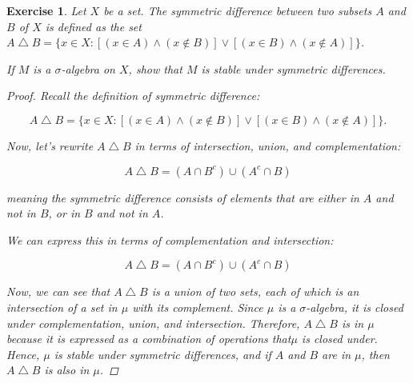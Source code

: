 \documentclass{article}
\newtheorem{exercise}{Exercise}
\begin{document}
    \begin{exercise}
        Let $X$ be a set. The symmetric difference between two subsets $A$ and $B$ of $X$ is defined as the set\\
$A \bigtriangleup B = \{x \in X : [(x \in A) \land (x \notin B)] \lor [(x \in B) \land (x \notin A)]\}$.

If $M$ is a $\sigma$-algebra on $X$, show that $M$ is stable under symmetric differences.

    \begin{proof}
        Recall the definition of symmetric difference:

\[
A \bigtriangleup B = \{x \in X : [(x \in A) \land (x \notin B)] \lor [(x \in B) \land (x \notin A)]\}.
\]

Now, let's rewrite $A \bigtriangleup B$ in terms of intersection, union, and complementation:

\[
A \bigtriangleup B = (A \cap B^c) \cup (A^c \cap B)
\]

meaning the symmetric difference consists of elements that are either in $A$ and not in $B$, or in $B$ and not in $A$.

We can express this in terms of complementation and intersection:

\[
A \bigtriangleup B = (A \cap B^c) \cup (A^c \cap B)
\]

Now, we can see that $A \bigtriangleup B$ is a union of two sets, each of which is an intersection of a set in $\mu$ with its complement. Since $\mu$ is a $\sigma$-algebra, it is closed under complementation, union, and intersection. Therefore, $A \bigtriangleup B$ is in $\mu$ because it is expressed as a combination of operations that$\mu$ is closed under.\\
    Hence, $\mu$ is stable under symmetric differences, and if $A$ and $B$ are in $\mu$, then $A \bigtriangleup B$ is also in $\mu$.


    \end{proof}
    \end{exercise}
\end{document}
